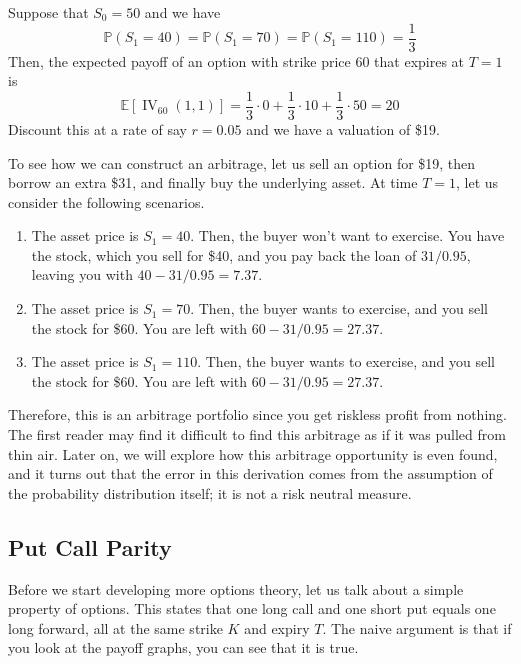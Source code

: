\documentclass{article}
\DeclareMathOperator{\IV}{IV}
\begin{document}
    \begin{example}
      \label{ex:arbitrage-opportunity}
      Suppose that $S_0 = 50$ and we have 
      \begin{equation}
        \mathbb{P}(S_1 = 40) = \mathbb{P}(S_1 = 70) = \mathbb{P}(S_1 = 110) = \frac{1}{3}
      \end{equation}
      Then, the expected payoff of an option with strike price $60$ that expires at $T = 1$ is 
      \begin{equation}
        \mathbb{E}[\IV_{60} (1, 1)] = \frac{1}{3} \cdot 0 + \frac{1}{3} \cdot 10 + \frac{1}{3} \cdot 50 = 20
      \end{equation}
      Discount this at a rate of say $r = 0.05$ and we have a valuation of \$19. 

      To see how we can construct an arbitrage, let us sell an option for \$19, then borrow an extra \$31, and finally buy the underlying asset. At time $T = 1$, let us consider the following scenarios. 
      \begin{enumerate}
        \item The asset price is $S_1 = 40$. Then, the buyer won't want to exercise. You have the stock, which you sell for \$40, and you pay back the loan of $31 /0.95$, leaving you with $40 - 31 / 0.95 = 7.37$.
        \item The asset price is $S_1 = 70$. Then, the buyer wants to exercise, and you sell the stock for \$60. You are left with $60 - 31 / 0.95 = 27.37$. 
        \item The asset price is $S_1 = 110$. Then, the buyer wants to exercise, and you sell the stock for \$60. You are left with $60 - 31 / 0.95 = 27.37$. 
      \end{enumerate}
      Therefore, this is an arbitrage portfolio since you get riskless profit from nothing. The first reader may find it difficult to find this arbitrage as if it was pulled from thin air. Later on, we will explore how this arbitrage opportunity is even found, and it turns out that the error in this derivation comes from the assumption of the probability distribution itself; it is not a risk neutral measure. 
    \end{example}
  
  \subsection{Put Call Parity}
    
    Before we start developing more options theory, let us talk about a simple property of options. This states that one long call and one short put equals one long forward, all at the same strike $K$ and expiry $T$. The naive argument is that if you look at the payoff graphs, you can see that it is true. 
\end{document}

